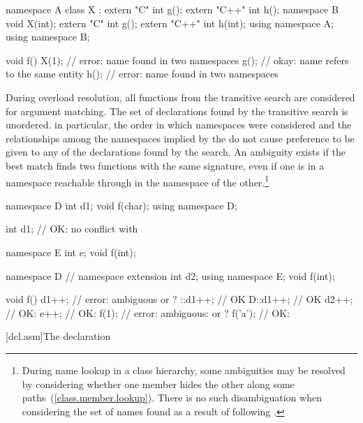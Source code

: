 \begin{codeblock}
namespace A {
	class X { };
	extern "C"   int g();
	extern "C++" int h();
}
namespace B {
	void X(int);
	extern "C"   int g();
	extern "C++" int h(int);
}
using namespace A;
using namespace B;

void f() {
	X(1);			// error: name  found in two namespaces
	g();			// okay: name  refers to the same entity
	h();			// error: name  found in two namespaces
}
\end{codeblock}
\exitnoteb

\pnum
{}%
During overload resolution, all functions from the transitive search are
considered for argument matching. The set of declarations found by the
transitive search is unordered.
\enternote
in particular, the order in which namespaces were considered and the
relationships among the namespaces implied by the
 do not cause preference to be given to any
of the declarations found by the search.
\exitnote
An ambiguity exists if the best match finds two functions with the same
signature, even if one is in a namespace reachable through
 in the namespace of the other.\footnote{During
name lookup in a class hierarchy, some ambiguities may be
resolved by considering whether one member hides the other along some
paths~(\ref{class.member.lookup}). There is no such disambiguation when
considering the set of names found as a result of following
.}\\
\enterexample

\begin{codeblock}
namespace D {
	int d1;
	void f(char);
}
using namespace D;

int d1;				// OK: no conflict with 

namespace E {
	int e;
	void f(int);
}

namespace D {			// namespace extension
	int d2;
	using namespace E;
	void f(int);
}

void f()
{
	d1++;			// error: ambiguous  or ?
	::d1++;			// OK
	D::d1++;		// OK
	d2++;			// OK: 
	e++;			// OK: 
	f(1);			// error: ambiguous:  or ?
	f('a');			// OK: 
}
\end{codeblock}
\exitexampleb%
%

[dcl.asm]{The  declaration}%
%
%


